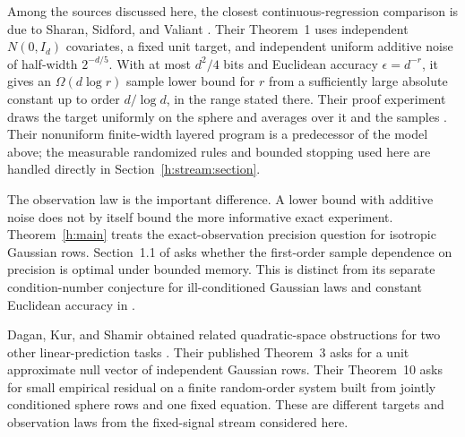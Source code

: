 Among the sources discussed here, the closest continuous-regression
comparison is due to Sharan, Sidford, and Valiant
\cite{SSV2019}. Their Theorem~1 uses independent \(N(0,I_d)\)
covariates, a fixed unit target, and independent uniform additive noise
of half-width \(2^{-d/5}\). With at most \(d^2/4\) bits and Euclidean
accuracy \(\epsilon=d^{-r}\), it gives an
\(\Omega(d\log r)\) sample lower bound for \(r\) from a sufficiently
large absolute constant up to order \(d/\log d\), in the range stated
there. Their proof experiment draws the target uniformly on the sphere
and averages over it and the samples \cite[Section~2]{SSV2019}.
Their nonuniform finite-width layered program is a predecessor of the
model above; the measurable randomized rules and bounded stopping used
here are handled directly in Section~\ref{h:stream:section}.

The observation law is the important difference. A lower bound with
additive noise does not by itself bound the more informative exact
experiment. Theorem~\ref{h:main} treats the exact-observation precision
question for isotropic Gaussian rows. Section~1.1 of \cite{SSV2019}
asks whether the first-order sample dependence on precision is optimal
under bounded memory. This is distinct from its separate
condition-number conjecture for ill-conditioned Gaussian laws and
constant Euclidean accuracy in \cite[Section~1.1]{SSV2019}.

Dagan, Kur, and Shamir obtained related quadratic-space obstructions
for two other linear-prediction tasks \cite{DKS2019}. Their published
Theorem~3 asks for a unit approximate null vector of independent
Gaussian rows. Their Theorem~10 asks for small empirical residual on
a finite random-order system built from jointly conditioned sphere
rows and one fixed equation. These are different targets and
observation laws from the fixed-signal stream considered here.

